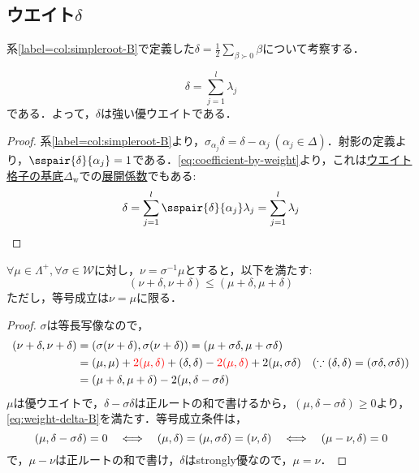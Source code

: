 \documentclass[rep_main]{subfiles}
\begin{document}
\subsection{ウエイト$\delta$}
系\ref{label=col:simpleroot-B}で定義した$\delta = \frac{1}{2}\sum_{\beta \succ 0} \beta$について考察する．
\begin{mylem}[label=lem:weight-delta-A]{}
	\begin{equation}
		\delta = \sum_{j = 1}^l \lambda_j
	\end{equation}
	である．よって，$\delta$は強い優ウエイトである．
\end{mylem}
\begin{proof}
	系\ref{label=col:simpleroot-B}より，$\sigma_{\alpha_j}\delta = \delta - \alpha_j\ (\alpha_j \in \Delta)$．射影の定義より，$\sspair{\delta}{\alpha_j} = 1$である．\eqref{eq:coefficient-by-weight}より，これは\hyperref[def:domweight]{ウエイト格子の基底}$\Delta_\text{w}$での\hyperref[eq:coefficient-by-weight]{展開係数}でもある:
	\begin{equation}
		\delta = \sum_{j=1}^l \sspair{\delta}{\alpha_j}\lambda_j = \sum_{j=1}^l \lambda_j
	\end{equation}
\end{proof}
\begin{mylem}[label=lem:weight-delta-B]{}
	$\forall \mu \in \Lambda^+, \forall \sigma \in \mathscr{W}$に対し，$\nu = \sigma^{-1}\mu$とすると，以下を満たす:
	\begin{equation}
		(\nu + \delta, \nu + \delta) \leq (\mu + \delta, \mu + \delta) \label{eq:weight-delta-B}
	\end{equation}
	ただし，等号成立は$\nu = \mu$に限る．
\end{mylem}
\begin{proof}
	$\sigma$は等長写像なので，
	\begin{align}
		(\nu + \delta, \nu + \delta) &= (\sigma(\nu + \delta), \sigma(\nu + \delta)) = (\mu + \sigma\delta, \mu + \sigma\delta)\\
		&= (\mu, \mu) + \textcolor{red}{2(\mu, \delta)} + (\delta, \delta) - \textcolor{red}{2(\mu, \delta)} +  2(\mu, \sigma\delta)\quad  (\because (\delta, \delta) = (\sigma\delta, \sigma\delta))\\
		&= (\mu + \delta, \mu + \delta) - 2(\mu, \delta - \sigma\delta)
	\end{align}
	$\mu$は優ウエイトで，$\delta - \sigma\delta$は正ルートの和で書けるから，$(\mu, \delta - \sigma\delta) \geq 0$より，\eqref{eq:weight-delta-B}を満たす．等号成立条件は，
	\begin{equation}
		(\mu, \delta - \sigma\delta) = 0 \quad \Longleftrightarrow \quad (\mu, \delta) = (\mu, \sigma\delta) = (\nu, \delta) \quad \Longleftrightarrow \quad (\mu - \nu, \delta) = 0
	\end{equation}
	で，$\mu - \nu$は正ルートの和で書け，$\delta$はstrongly優なので，$\mu = \nu$．
\end{proof}
\end{document}
